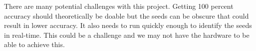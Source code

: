\documentclass[onecolumn, draftclsnofoot,10pt, compsoc]{IEEEtran}
\begin{document}
	There are many potential challenges with this project. Getting 100 percent accuracy should theoretically be doable but the seeds can be obscure that could result in lower accuracy. It also needs to run quickly enough to identify the seeds in real-time. This could be a challenge and we may not have the hardware to be able to achieve this. 
\end{document}
